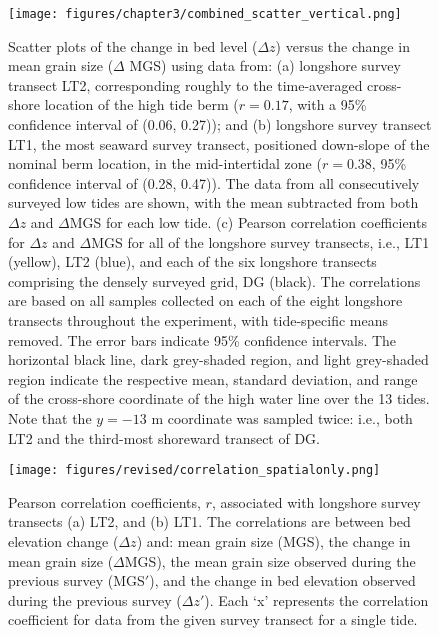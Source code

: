 \documentclass[jmse,article,submit,pdftex,moreauthors]{Definitions/mdpi}
\begin{document}
\begin{figure}[tbp] %
	\begin{center}
		\texttt{[image: figures/chapter3/combined\_scatter\_vertical.png]}
		\caption[Cross-shore dependence of correlations between bed level and mean grain size change]{Scatter plots of the change in bed level ($\Delta z$) versus the change in mean grain size ($\Delta$ MGS) using data from: (a) longshore survey transect LT2, corresponding roughly to the time-averaged cross-shore location of the high tide berm ($r=0.17$, with a 95\% confidence interval of (0.06, 0.27)); and (b) longshore survey transect LT1, the most seaward survey transect, positioned down-slope of the nominal berm location, in the mid-intertidal zone ($r=0.38$, 95\% confidence interval of (0.28, 0.47)). The data from all consecutively surveyed low tides are shown, with the mean subtracted from both $\Delta z$ and $\Delta$MGS for each low tide. (c) Pearson correlation coefficients for $\Delta z$ and $\Delta$MGS for all of the longshore survey transects, i.e., LT1 (yellow), LT2 (blue), and each of the six longshore transects comprising the densely surveyed grid, DG (black). The correlations are based on all samples collected on each of the eight longshore transects throughout the experiment, with tide-specific means removed. The error bars indicate 95\% confidence intervals. The horizontal black line, dark grey-shaded region, and light grey-shaded region indicate the respective mean, standard deviation, and range of the cross-shore coordinate of the high water line over the 13 tides. Note that the $y=-13$ m coordinate was sampled twice: i.e., both LT2 and the third-most shoreward transect of DG.}
		\label{fig:corr_coeffs_spatial}
	\end{center}
\end{figure}

\begin{figure}[tbp] %
	\begin{center}
		\texttt{[image: figures/revised/correlation\_spatialonly.png]}
		\caption[Spatial correlation coefficients]{Pearson correlation coefficients, $r$, associated with longshore survey transects (a) LT2, and (b) LT1. The correlations are between bed elevation change ($\Delta z$) and: mean grain size (MGS), the change in mean grain size ($\Delta$MGS), the mean grain size observed during the previous survey (MGS$'$), and the change in bed elevation observed during the previous survey ($\Delta z'$). Each `x' represents the correlation coefficient for data from the given survey transect for a single tide.}
		\label{fig:corr_coeffs_all}
	\end{center}
\end{figure}
\end{document}
